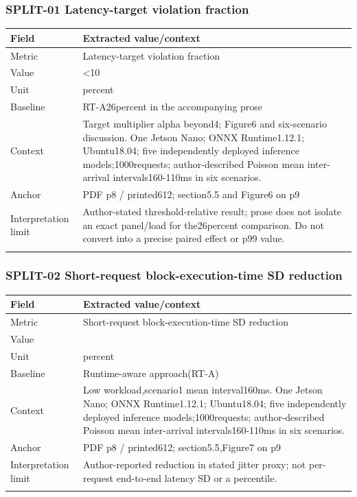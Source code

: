 \subsubsection*{SPLIT-01 Latency-target violation fraction}
\begin{longtable}{>{\raggedright\arraybackslash}p{}>{\raggedright\arraybackslash}p{}}
\toprule
\textbf{Field} & \textbf{Extracted value/context}\\\midrule\endhead
Metric & Latency-target violation fraction\\\addlinespace
Value & <10\\\addlinespace
Unit & percent\\\addlinespace
Baseline & RT-A26percent in the accompanying prose\\\addlinespace
Context & Target multiplier alpha beyond4;\allowbreak{} Figure6 and six-scenario discussion. One Jetson Nano;\allowbreak{} ONNX Runtime1.12.1;\allowbreak{} Ubuntu18.04;\allowbreak{} five independently deployed inference models;\allowbreak{}1000requests;\allowbreak{} author-described Poisson mean inter-arrival intervals160-110ms in six scenarios.\\\addlinespace
Anchor & PDF p8 / printed612;\allowbreak{} section5.5 and Figure6 on p9\\\addlinespace
Interpretation limit & Author-stated threshold-relative result;\allowbreak{} prose does not isolate an exact panel/load for the26percent comparison. Do not convert into a precise paired effect or p99 value.\\\addlinespace
\bottomrule\end{longtable}
\subsubsection*{SPLIT-02 Short-request block-execution-time SD reduction}
\begin{longtable}{>{\raggedright\arraybackslash}p{}>{\raggedright\arraybackslash}p{}}
\toprule
\textbf{Field} & \textbf{Extracted value/context}\\\midrule\endhead
Metric & Short-request block-execution-time SD reduction\\\addlinespace
Value & 68.9\\\addlinespace
Unit & percent\\\addlinespace
Baseline & Runtime-aware approach(RT-A)\\\addlinespace
Context & Low workload,\allowbreak{}scenario1 mean interval160ms. One Jetson Nano;\allowbreak{} ONNX Runtime1.12.1;\allowbreak{} Ubuntu18.04;\allowbreak{} five independently deployed inference models;\allowbreak{}1000requests;\allowbreak{} author-described Poisson mean inter-arrival intervals160-110ms in six scenarios.\\\addlinespace
Anchor & PDF p8 / printed612;\allowbreak{} section5.5,\allowbreak{}Figure7 on p9\\\addlinespace
Interpretation limit & Author-reported reduction in stated jitter proxy;\allowbreak{} not per-request end-to-end latency SD or a percentile.\\\addlinespace
\bottomrule\end{longtable}
